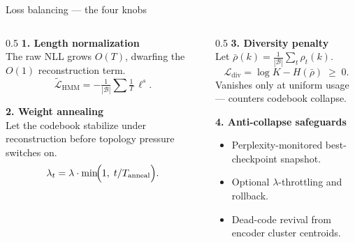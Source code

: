 \documentclass[aspectratio=169,10pt]{beamer}
\newcommand{\Lcal}{\mathcal{L}}
\begin{document}
\begin{frame}{Loss balancing --- the four knobs}
  \begin{columns}[T,onlytextwidth]
    \begin{column}{0.5\textwidth}
      \textbf{1. Length normalization}\\
      The raw NLL grows $O(T)$, dwarfing the $O(1)$ reconstruction term.
      \[
        \widetilde{\Lcal}_{\text{HMM}} = -\tfrac{1}{|\mathcal{B}|}\!\sum \tfrac{1}{T}\,\ell^{s}.
      \]

      \vspace{0.5em}
      \textbf{2. Weight annealing}\\
      Let the codebook stabilize under reconstruction before topology
      pressure switches on.
      \[
        \lambda_t = \lambda \cdot \min\!\Bigl(1,\; t/T_{\text{anneal}}\Bigr).
      \]
    \end{column}
    \begin{column}{0.5\textwidth}
      \textbf{3. Diversity penalty}\\
      Let $\bar\rho(k) = \tfrac{1}{|\mathcal{B}|}\sum_t \rho_t(k)$.
      \[
        \Lcal_{\text{div}} = \log K - H(\bar\rho) \;\ge\; 0.
      \]
      Vanishes only at uniform usage --- counters codebook collapse.

      \vspace{0.5em}
      \textbf{4. Anti-collapse safeguards}\\
      \begin{itemize}\setlength\itemsep{0.15em}
        \item Perplexity-monitored best-checkpoint snapshot.
        \item Optional $\lambda$-throttling and rollback.
        \item Dead-code revival from encoder cluster centroids.
      \end{itemize}
    \end{column}
  \end{columns}
\end{frame}
\end{document}
